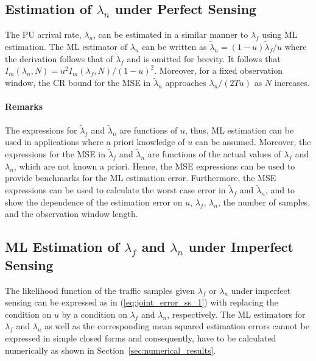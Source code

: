 \documentclass[11pt,draftclsnofoot,journal,onecolumn]{IEEEtran}
\begin{document}
\subsection{Estimation of $\lambda_{n}$ under Perfect Sensing}
\label{sec:lambda_n_estimation_ML}

The PU arrival rate, $\lambda_{n}$, can be estimated in a similar manner to $\lambda_{f}$ using ML estimation. The ML estimator of $\lambda_{n}$ can be written as $\tilde\lambda_{n} = \left(1-u\right)\tilde\lambda_{f}/u$ where the derivation follows that of $\tilde\lambda_{f}$ and is omitted for brevity. It follows that $I_m\left(\lambda_n,N\right) = u^2 I_m\left(\lambda_f,N\right)/\left(1-u\right)^2$. Moreover, for a fixed observation window, the CR bound for the MSE in $\tilde\lambda_{n}$ approaches $\lambda_n/\left(2Tu\right)$ as $N$ increases.

\paragraph*{Remarks}
\label{sec:lambda_f_estimation_ML_Remarks}

The expressions for $\tilde\lambda_{f}$ and $\tilde\lambda_{n}$ are functions of $u$, thus, ML estimation can be used in applications where a priori knowledge of $u$ can be assumed. Moreover, the expressions for the MSE in $\tilde\lambda_{f}$ and $\tilde\lambda_{n}$ are functions of the actual values of $\lambda_{f}$ and $\lambda_{n}$, which are not known a priori. Hence, the MSE expressions can be used to provide benchmarks for the ML estimation error. Furthermore, the MSE expressions can be used to calculate the worst case error in $\tilde\lambda_{f}$ and $\tilde\lambda_{n}$, and to show the dependence of the estimation error on $u$, $\lambda_f$, $\lambda_n$, the number of samples, and the observation window length.

\subsection{ML Estimation of $\lambda_{f}$ and $\lambda_{n}$ under Imperfect Sensing}
\label{sec:ml_lambda_se}

The likelihood function of the traffic samples given $\lambda_f$ or $\lambda_n$ under imperfect sensing can be expressed as in (\ref{eq;joint_error_ss_1}) with replacing the condition on $u$ by a condition on $\lambda_f$ and $\lambda_n$, respectively. The ML estimators for $\lambda_f$ and $\lambda_n$ as well as the corresponding mean squared estimation errors cannot be expressed in simple closed forms and consequently, have to be calculated numerically as shown in Section~\ref{sec:numerical_results}.
\end{document}
